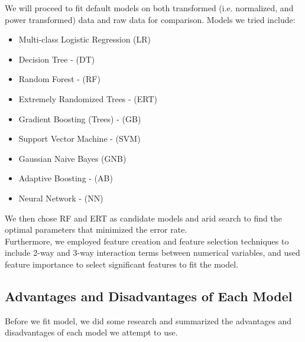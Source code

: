 \documentclass[11pt]{article}
\begin{document}
\noindent We will proceed to fit default models on both transformed (i.e. normalized, and power transformed) data and raw data for comparison. Models we tried include:
\begin{itemize}
\setlength\itemsep{0cm}
\item Multi-class Logistic Regression (LR)
\item Decision Tree - (DT)
\item Random Forest - (RF)
\item Extremely Randomized Trees - (ERT)
\item Gradient Boosting (Trees) - (GB)
\item Support Vector Machine - (SVM)
\item Gaussian Naive Bayes (GNB)
\item Adaptive Boosting - (AB)
\item Neural Network - (NN)
\end{itemize}
We then chose RF and ERT as candidate models and arid search to find the optimal parameters that minimized the error rate. \\

\noindent Furthermore, we employed feature creation and feature selection techniques to include 2-way and 3-way interaction terms between numerical variables, and used feature importance to select significant features to fit the model. 

\subsection{Advantages and Disadvantages of Each Model}
Before we fit model, we did some research and summarized the advantages and disadvantages of each model we attempt to use.
\end{document}
